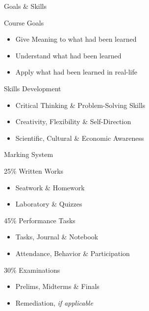 \documentclass[14pt,aspectratio=169]{beamer}
\begin{document}
\begin{frame}{Goals \& Skills}
 \begin{block}{Course Goals}
  \begin{itemize}
   \item Give Meaning to what had been learned
   \item Understand what had been learned
   \item Apply what had been learned in real-life
  \end{itemize}

 \end{block}

 \begin{block}{Skills Development}
  \begin{itemize}
   \item Critical Thinking \& Problem-Solving Skills
   \item Creativity, Flexibility \& Self-Direction
   \item Scientific, Cultural \& Economic Awareness
  \end{itemize}

 \end{block}


\end{frame}


\begin{frame}{Marking System}
 \begin{block}{25\% Written Works}
 \begin{itemize}
  \item Seatwork \& Homework
  \item Laboratory \& Quizzes
 \end{itemize}

 \end{block}

 \begin{block}{45\% Performance Tasks}
 \begin{itemize}
  \item Tasks, Journal \& Notebook
  \item Attendance, Behavior \& Participation
 \end{itemize}
 \end{block}

 \begin{block}{30\% Examinations}
 \begin{itemize}
  \item Prelims, Midterms \& Finals
  \item Remediation, \textit{if applicable}
 \end{itemize}

 \end{block}



\end{frame}
\end{document}

